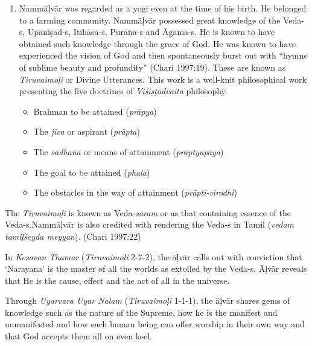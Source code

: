 \begin{enumerate}[{\rm 1.}]
 \item 
 Nammāḷvār was regarded as a yogi even at the time of his birth. He belonged to a farming community. Nammāḷvār possessed great knowledge of the Veda-s, Upaniṣad-s, Itihāsa-s, Purāņa-s and Āgama-s. He is known to have obtained such knowledge through the grace of God. He was known to have experienced the vision of God and then spontaneously burst out with “hymns of sublime beauty and profundity” (Chari 1997:19). These are known as \textit{Tiruvaimoḷi} or Divine Utterances. This work is a well-knit philosophical work presenting the five doctrines of \textit{Viśiṣṭādvaita} philosophy.

\begin{itemize}
\item Brahman to be attained (\textit{prāpya})

 \item The \textit{jīva} or aspirant (\textit{prāpta})

 \item The \textit{sādhana} or means of attainment (\textit{prāptyupāya})

 \item The goal to be attained (\textit{phala})

 \item The obstacles in the way of attainment (\textit{prāpti-virodhi})
\end{itemize}

\end{enumerate}

The \textit{Tiruvaimoḷi} is known as Veda-\textit{sāram} or as that containing essence of the Veda-s.Nammāḷvār is also credited with rendering the Veda-s in Tamil (\textit{vedam tamiḷśeyda meyyan}). (Chari 1997:22)

In \textit{Kesavan Thamar} (\textit{Tiruvaimoḷi} 2-7-2), the āḷvār calls out with conviction that ‘Narayana’ is the master of all the worlds as extolled by the Veda-s. Āḷvār reveals that He is the cause, effect and the act of all in the universe.

Through \textit{Uyarvara Uyar Nalam} (\textit{Tiruvaimoḷi} 1-1-1), the āḷvār shares gems of knowledge such as the nature of the Supreme, how he is the manifest and unmanifested and how each human being can offer worship in their own way and that God accepts them all on even keel.

